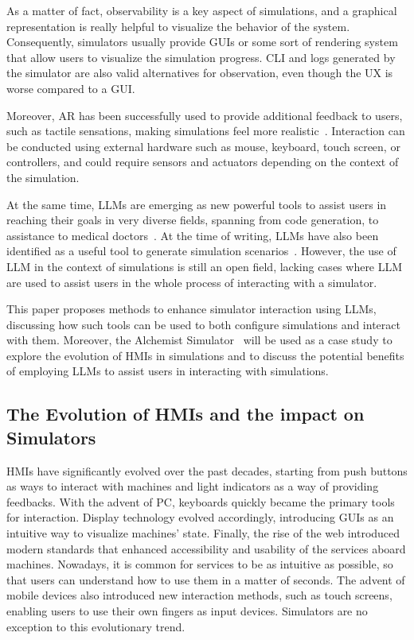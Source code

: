 \documentclass[conference]{IEEEtran}
\begin{document}
As a matter of fact,
observability is a key aspect of simulations,
and a graphical representation is really helpful to visualize the behavior of the system.
%
Consequently,
simulators usually provide \acp{GUI} or some sort of rendering system that allow users to visualize the simulation progress.
%
\ac{CLI} and logs generated by the simulator are also valid alternatives for observation,
even though the \ac{UX} is worse compared to a \ac{GUI}.

Moreover,
\ac{AR} has been successfully used to provide additional feedback to users,
such as tactile sensations,
making simulations feel more realistic~\cite{Jud2020}.
%
Interaction can be conducted using external hardware such as mouse, keyboard, touch screen, or controllers,
and could require sensors and actuators depending on the context of the simulation.

At the same time,
\ac{LLM}s are emerging as new powerful tools to assist users in reaching their goals in very diverse fields,
spanning from code generation,
to assistance to medical doctors~\cite{Wu2024}.
%
At the time of writing,
\acp{LLM} have also been identified as a useful tool to generate simulation scenarios~\cite{Zhang2023}.
%
However,
the use of \ac{LLM} in the context of simulations is still an open field,
lacking cases where \ac{LLM} are used to assist users in the whole process of interacting with a simulator.

This paper proposes methods to enhance simulator interaction using \acp{LLM},
discussing how such tools can be used to both configure simulations and interact with them.
%
Moreover,
the Alchemist Simulator~\cite{Pianini_2013} will be used as a case study to explore the evolution of \acp{HMI} in simulations and to discuss the potential benefits of employing \acp{LLM} to assist users in interacting with simulations.

\subsection{The Evolution of \acp{HMI} and the impact on Simulators}

\acp{HMI} have significantly evolved over the past decades,
starting from push buttons as ways to interact with machines and light indicators as a way of providing feedbacks.
%
With the advent of \ac{PC},
keyboards quickly became the primary tools for interaction.
%
Display technology evolved accordingly,
introducing \acp{GUI} as an intuitive way to visualize machines' state.
%
Finally,
the rise of the web introduced modern standards that enhanced accessibility and usability of the services aboard machines.
%
Nowadays,
it is common for services to be as intuitive as possible,
so that users can understand how to use them in a matter of seconds.
%
The advent of mobile devices also introduced new interaction methods,
such as touch screens,
enabling users to use their own fingers as input devices.
%
Simulators are no exception to this evolutionary trend.
%
\end{document}
